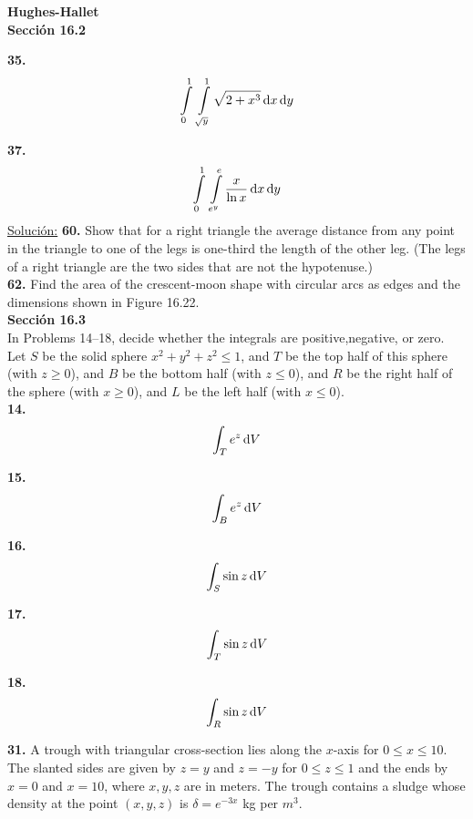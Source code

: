 \documentclass[11pt]{report}
\newcommand{\s}{\underline{Soluci\'{o}n:}}
\begin{document}
\textbf{Hughes-Hallet} \\

\textbf{Sección 16.2}

\textbf{35.} \\

\[ \int \limits_0^1 \, \int \limits_{\sqrt{y}}^1 \sqrt{2 + x^3} \, \text dx \, \text dy \]

\textbf{37.} \\

\[ \int \limits_0^1 \, \int \limits_{e^y}^e \frac{x}{\ln{x}} \, \text dx \, \text dy \]
\s
\textbf{60.} Show that for a right triangle the average distance from any point
in the triangle to one of the legs is one-third the length of the other leg.
(The legs of a right triangle are the two sides that are not the hypotenuse.) \\

\textbf{62.} Find the area of the crescent-moon shape with circular arcs as edges
and the dimensions shown in Figure 16.22. \\

\textbf{Sección 16.3} \\

In Problems 14–18, decide whether the integrals are positive,negative, or zero.
Let $S$ be the solid sphere $x^2 + y^2 + z^2 \leq 1$, and $T$ be the top half of
this sphere (with $z \geq 0$), and $B$ be the bottom half (with $z \leq 0$), and $R$
be the right half of the sphere (with $x \geq 0$), and $L$ be the left half
(with $x \leq 0$). \\

\textbf{14.} \\

\[ \int _T e^z \, \text dV \]

\textbf{15.} \\

\[ \int _B e^z \, \text dV \]

\textbf{16.} \\

\[ \int _S \sin{z} \, \text dV \]

\textbf{17.} \\

\[ \int _T \sin{z} \, \text dV \]

\textbf{18.} \\

\[ \int _R \sin{z} \, \text dV \]

\textbf{31.} A trough with triangular cross-section lies along the $x$-axis for
$0 \leq x \leq 10$. The slanted sides are given by $z = y$ and $z = -y$ for
$0 \leq z \leq 1$ and the ends by $x = 0$ and $x = 10$, where $x, y, z$ are in meters.
The trough contains a sludge whose density at the point $(x, y, z)$ is
$\delta = e^{-3x}$ kg per $m^3$. \\
\end{document}

